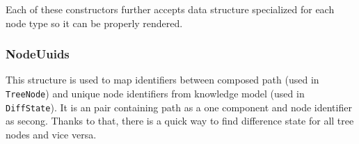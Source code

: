 Each of these constructors further accepts data structure specialized for each node type so it can be properly rendered.

\subsubsection*{NodeUuids}

This structure is used to map identifiers between composed path (used in \texttt{TreeNode}) and unique node identifiers from knowledge model (used in \texttt{DiffState}).
It is an pair containing path as a one component and node identifier as secong.
Thanks to that, there is a quick way to find difference state for all tree nodes and vice versa.
